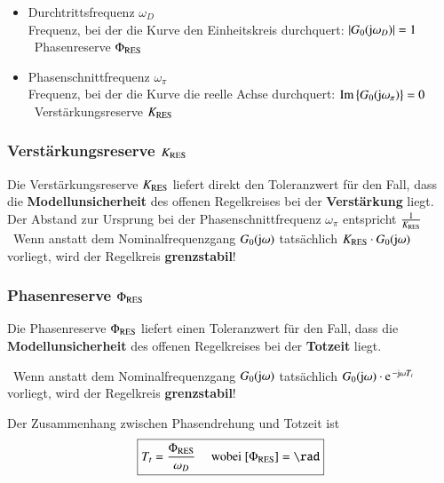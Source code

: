 \begin{itemize}
    \item Durchtrittsfrequenz $\omega_{D}$ \\
        Frequenz, bei der die Kurve den Einheitskreis durchquert: $| G_{0}(\mathrm{j} \omega_{D})| = 1 $ \\
        \textrightarrow\ Phasenreserve $\Phi_{\rm RES}$
    
    \item Phasenschnittfrequenz $\omega_{\pi}$ \\
        Frequenz, bei der die Kurve die reelle Achse durchquert: $\operatorname{Im}\left\{G_{0}(\mathrm{j} \omega_{\pi})\right\} = 0$\\
        \textrightarrow\ Verstärkungsreserve $K_{\rm RES}$
\end{itemize}


\subsubsection{Verstärkungsreserve $K_{\rm RES}$}

Die Verstärkungsreserve $K_{\rm RES}$ liefert direkt den Toleranzwert für den Fall, dass die \textbf{Modellunsicherheit} des 
offenen Regelkreises bei der \textbf{Verstärkung} liegt. \\
Der Abstand zur Ursprung bei der Phasenschnittfrequenz $\omega_{\pi}$ entspricht $\frac{1}{K_{\rm RES}}$ \\
\textrightarrow\ Wenn anstatt dem Nominalfrequenzgang $G_0(\mathrm{j} \omega)$ tatsächlich $K_{\rm RES} \cdot G_0(\mathrm{j} \omega)$ vorliegt, wird der
Regelkreis \textbf{grenzstabil}!


\subsubsection{Phasenreserve $\Phi_{\rm RES}$}

Die Phasenreserve $\Phi_{\rm RES}$ liefert einen Toleranzwert für den Fall, dass die \\
\textbf{Modellunsicherheit} des offenen Regelkreises bei der \textbf{Totzeit} liegt.

\textrightarrow\ Wenn anstatt dem Nominalfrequenzgang $G_0(\mathrm{j} \omega)$ tatsächlich $G_0(\jimg \omega) \cdot \e^{- \jimg \omega T_t}$ vorliegt, 
wird der Regelkreis \textbf{grenzstabil}!
\bigskip

Der Zusammenhang zwischen Phasendrehung und Totzeit ist
$$ \boxed{ T_t = \frac{\Phi_{\rm RES}}{\omega_D}  \quad \text{ wobei } [\Phi_{\rm RES}] = \rad } $$


